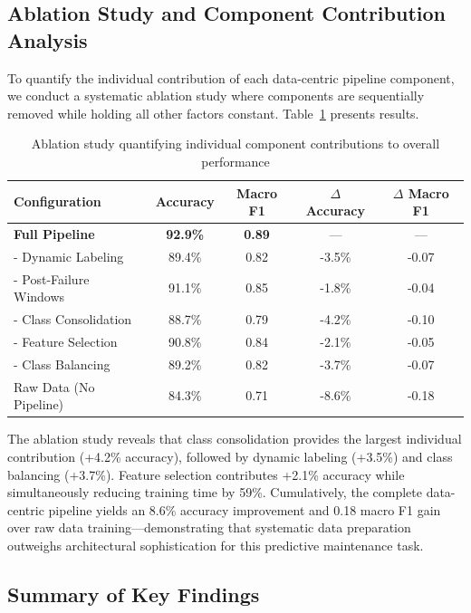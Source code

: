 \documentclass[12pt]{article}
\begin{document}
\subsection{Ablation Study and Component Contribution Analysis}

To quantify the individual contribution of each data-centric pipeline component, we conduct a systematic ablation study where components are sequentially removed while holding all other factors constant. Table~\ref{tab:ablation_study} presents results.

\begin{table}[htbp]
\centering
\caption{Ablation study quantifying individual component contributions to overall performance}
\label{tab:ablation_study}
\begin{tabular}{lcccc}
\toprule
\textbf{Configuration} & \textbf{Accuracy} & \textbf{Macro F1} & \textbf{$\Delta$ Accuracy} & \textbf{$\Delta$ Macro F1} \\
\midrule
\textbf{Full Pipeline} & \textbf{92.9\%} & \textbf{0.89} & --- & --- \\
\midrule
- Dynamic Labeling & 89.4\% & 0.82 & -3.5\% & -0.07 \\
- Post-Failure Windows & 91.1\% & 0.85 & -1.8\% & -0.04 \\
- Class Consolidation & 88.7\% & 0.79 & -4.2\% & -0.10 \\
- Feature Selection & 90.8\% & 0.84 & -2.1\% & -0.05 \\
- Class Balancing & 89.2\% & 0.82 & -3.7\% & -0.07 \\
\midrule
Raw Data (No Pipeline) & 84.3\% & 0.71 & -8.6\% & -0.18 \\
\bottomrule
\end{tabular}
\end{table}

The ablation study reveals that class consolidation provides the largest individual contribution (+4.2\% accuracy), followed by dynamic labeling (+3.5\%) and class balancing (+3.7\%). Feature selection contributes +2.1\% accuracy while simultaneously reducing training time by 59\%. Cumulatively, the complete data-centric pipeline yields an 8.6\% accuracy improvement and 0.18 macro F1 gain over raw data training—demonstrating that systematic data preparation outweighs architectural sophistication for this predictive maintenance task.

\subsection{Summary of Key Findings}
\end{document}
